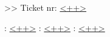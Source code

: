 \section{\secKonklution}
\txtSuccess	
\begin{todolist}
	\item \txtJa
	\item \txtNej
	>>
	\textit{\txtNejTicket} Ticket nr: \underline{<++>}
\end{todolist}
\txtKommentar: \underline{<++>}
\vfill
\noindent
{\txtStikord}: \underline{<++>}
\vfill
\noindent
\txtDoneBy: \underline{<++>}
\vfill

